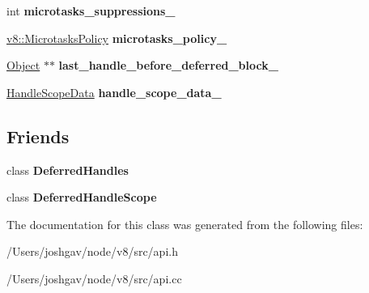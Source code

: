 \begin{DoxyCompactItemize}
\item 
int {\bfseries microtasks\+\_\+suppressions\+\_\+}\hypertarget{classv8_1_1internal_1_1_handle_scope_implementer_a0d723c45ceb3637c678fe13fed2090df}{}\label{classv8_1_1internal_1_1_handle_scope_implementer_a0d723c45ceb3637c678fe13fed2090df}

\item 
\hyperlink{namespacev8_a2f183b102b3d1b7a30a805e8c53c04da}{v8\+::\+Microtasks\+Policy} {\bfseries microtasks\+\_\+policy\+\_\+}\hypertarget{classv8_1_1internal_1_1_handle_scope_implementer_a6ace9a8c53319a44bbe66cb9022d5d86}{}\label{classv8_1_1internal_1_1_handle_scope_implementer_a6ace9a8c53319a44bbe66cb9022d5d86}

\item 
\hyperlink{classv8_1_1internal_1_1_object}{Object} $\ast$$\ast$ {\bfseries last\+\_\+handle\+\_\+before\+\_\+deferred\+\_\+block\+\_\+}\hypertarget{classv8_1_1internal_1_1_handle_scope_implementer_af6bc9393a0862cd8c726d8fffb9dc75d}{}\label{classv8_1_1internal_1_1_handle_scope_implementer_af6bc9393a0862cd8c726d8fffb9dc75d}

\item 
\hyperlink{structv8_1_1internal_1_1_handle_scope_data}{Handle\+Scope\+Data} {\bfseries handle\+\_\+scope\+\_\+data\+\_\+}\hypertarget{classv8_1_1internal_1_1_handle_scope_implementer_a5f1cc8020be6aeee5674367b8d706f87}{}\label{classv8_1_1internal_1_1_handle_scope_implementer_a5f1cc8020be6aeee5674367b8d706f87}

\end{DoxyCompactItemize}
\subsection*{Friends}
\begin{DoxyCompactItemize}
\item 
class {\bfseries Deferred\+Handles}\hypertarget{classv8_1_1internal_1_1_handle_scope_implementer_abf66bd266bd1fddbc859832c4838b436}{}\label{classv8_1_1internal_1_1_handle_scope_implementer_abf66bd266bd1fddbc859832c4838b436}

\item 
class {\bfseries Deferred\+Handle\+Scope}\hypertarget{classv8_1_1internal_1_1_handle_scope_implementer_ab79a97e63b62ac3e95a40640e3e70f96}{}\label{classv8_1_1internal_1_1_handle_scope_implementer_ab79a97e63b62ac3e95a40640e3e70f96}

\end{DoxyCompactItemize}


The documentation for this class was generated from the following files\+:\begin{DoxyCompactItemize}
\item 
/\+Users/joshgav/node/v8/src/api.\+h\item 
/\+Users/joshgav/node/v8/src/api.\+cc\end{DoxyCompactItemize}
